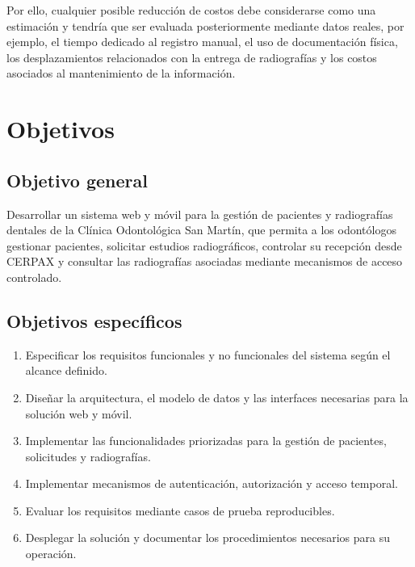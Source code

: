  Por ello, cualquier posible reducción de costos debe considerarse como una
 estimación y tendría que ser evaluada posteriormente mediante datos reales,
 por ejemplo, el tiempo dedicado al registro manual, el uso de documentación
 física, los desplazamientos relacionados con la entrega de radiografías y
 los costos asociados al mantenimiento de la información.	

	
	
	
	
	
	\section{Objetivos}
	
	
	\subsection{Objetivo general}
	
	Desarrollar un sistema web y móvil para la gestión de pacientes y
	radiografías dentales de la Clínica Odontológica San Martín, que
	permita a los odontólogos gestionar pacientes, solicitar estudios
	radiográficos, controlar su recepción desde CERPAX y consultar las
	radiografías asociadas mediante mecanismos de acceso controlado.
	
	
	\subsection{Objetivos específicos}
	
	\begin{enumerate}
		
		\item
		Especificar los requisitos funcionales y no funcionales del
		sistema según el alcance definido.
		
		\item
		Diseñar la arquitectura, el modelo de datos y las interfaces
		necesarias para la solución web y móvil.
		
		\item
		Implementar las funcionalidades priorizadas para la gestión de
		pacientes, solicitudes y radiografías.
		
		\item
		Implementar mecanismos de autenticación, autorización y acceso
		temporal.
		
		\item
		Evaluar los requisitos mediante casos de prueba reproducibles.
		
		\item
		Desplegar la solución y documentar los procedimientos necesarios
		para su operación.
		
	\end{enumerate}
	
